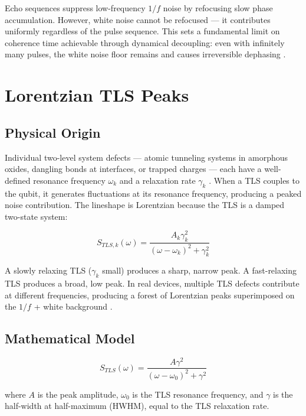 \documentclass[10pt]{article}
\begin{document}
Echo sequences suppress low-frequency $1/f$ noise by refocusing slow phase accumulation. However, white noise cannot be refocused — it contributes uniformly regardless of the pulse sequence. This sets a fundamental limit on coherence time achievable through dynamical decoupling: even with infinitely many pulses, the white noise floor remains and causes irreversible dephasing \cite{Cywinski2008}.

\section{Lorentzian TLS Peaks}

\subsection{Physical Origin}

Individual two-level system defects — atomic tunneling systems in amorphous oxides, dangling bonds at interfaces, or trapped charges — each have a well-defined resonance frequency $\omega_k$ and a relaxation rate $\gamma_k$ \cite{Muller2019, Martinis2005}. When a TLS couples to the qubit, it generates fluctuations at its resonance frequency, producing a peaked noise contribution. The lineshape is Lorentzian because the TLS is a damped two-state system:

\begin{equation}
    S_{TLS,k}(\omega) = \frac{A_k \gamma_k^2}{(\omega - \omega_k)^2 + \gamma_k^2}
\end{equation}

A slowly relaxing TLS ($\gamma_k$ small) produces a sharp, narrow peak. A fast-relaxing TLS produces a broad, low peak. In real devices, multiple TLS defects contribute at different frequencies, producing a forest of Lorentzian peaks superimposed on the $1/f$ + white background \cite{Muller2019}.

\subsection{Mathematical Model}

\begin{equation}
    \boxed{S_{TLS}(\omega) = \frac{A \gamma^2}{(\omega - \omega_0)^2 + \gamma^2}}
\end{equation}

where $A$ is the peak amplitude, $\omega_0$ is the TLS resonance frequency, and $\gamma$ is the half-width at half-maximum (HWHM), equal to the TLS relaxation rate.
\end{document}
